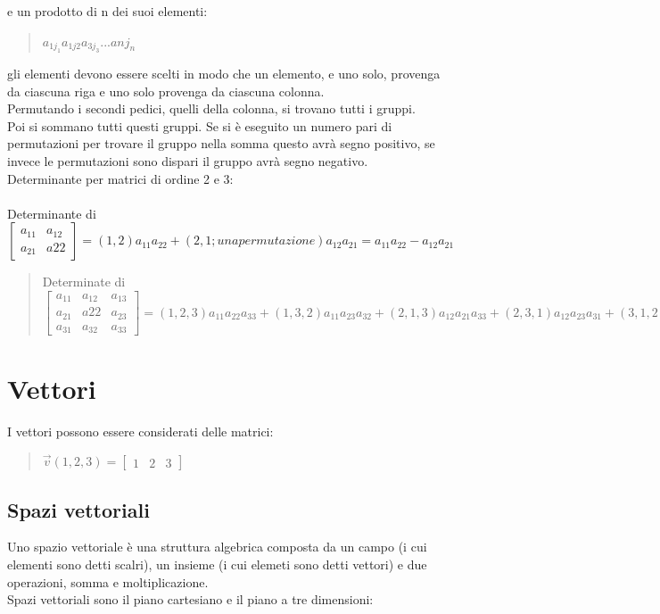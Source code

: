 \documentclass[a4paper]{article}
\begin{document}
e un prodotto di n dei suoi elementi: 
\\\begin{quote} \centering
$a_{1j_{1}} a_{1j{2}} a_{3j_{3}} ... a {nj_{n}}$
\end{quote}
gli elementi devono essere scelti in modo che un elemento, e uno solo, provenga da ciascuna riga e uno solo provenga da ciascuna colonna.
\\ Permutando i secondi pedici, quelli della colonna, si trovano tutti i gruppi.
\\ Poi si sommano tutti questi gruppi. Se si è eseguito un numero pari di permutazioni per trovare il gruppo nella somma questo avrà segno positivo, se invece le permutazioni sono dispari il gruppo avrà segno negativo.
\\ Determinante per matrici di ordine 2 e 3:
\\
\\ Determinante di $\left[\begin{matrix}a_{11} & a_{12} \\ a_{21} & a{22} \end{matrix}\right]
= (1,2) a_{11} a_{22} + (2,1; una permutazione) a_{12}a_{21}= a_{11} a_{22} - a_{12}a_{21}
$
\begin{quote} \centering
Determinate di $\left[\begin{matrix}a_{11} & a_{12} & a_{13} \\ a_{21} & a{22} & a_{23} \\ a_{31} & a_{32} & a_{33} \end{matrix}\right] = (1,2,3) a_{11}a_{22}a_{33} + (1,3,2) a_{11}a_{23}a_{32} + (2,1,3) a_{12}a_{21}a_{33} + (2,3,1) a_{12}a_{23}a_{31} + (3,1,2) a_{13}a_{21}a_{32} + (3,2,1) a_{13}a_{22}a_{31} = a_{11}a_{22}a_{33} - a_{11}a_{23}a_{32} - a_{12}a_{21}a_{33} + a_{12}a_{23}a_{31} + a_{13}a_{21}a_{32} - a_{13}a_{22}a_{31} 
$\end{quote}

\section{Vettori}
I vettori possono essere considerati delle matrici:
\\
\begin{quote} \centering
$\vec{v}(1,2,3) =\left[\begin{matrix} 1 & 2 & 3\end{matrix}\right]
$\end{quote}
\subsection{Spazi vettoriali}
Uno spazio vettoriale è una struttura algebrica composta da un campo (i cui elementi sono detti scalri), un insieme (i cui elemeti sono detti vettori) e due operazioni, somma e moltiplicazione.
\\ Spazi vettoriali sono il piano cartesiano e il piano a tre dimensioni:
\\
\end{document}
